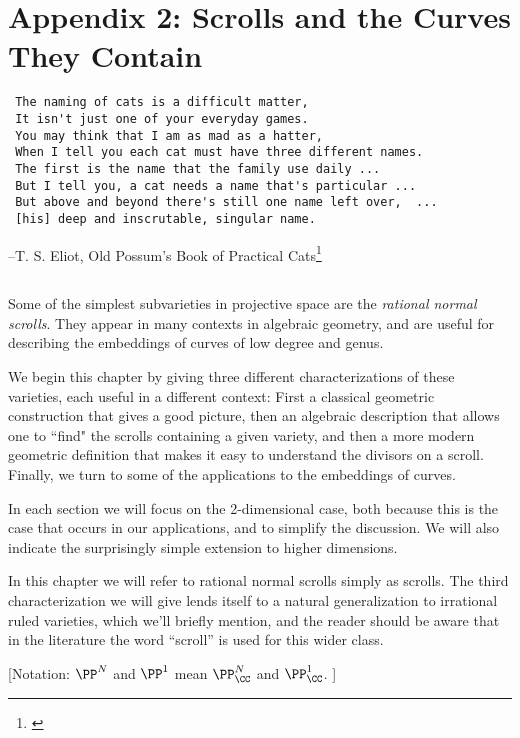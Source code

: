 

\chapter{Appendix 2: Scrolls and the Curves They Contain}
\label{ScrollsChapter}

\begin{verbatim}
 The naming of cats is a difficult matter,
 It isn't just one of your everyday games.
 You may think that I am as mad as a hatter,
 When I tell you each cat must have three different names.
 The first is the name that the family use daily ...
 But I tell you, a cat needs a name that's particular ...
 But above and beyond there's still one name left over,  ...
 [his] deep and inscrutable, singular name.
\end{verbatim}
--T. S. Eliot, Old Possum's Book of Practical Cats\footnote{\cite{PracticalCats}}

\section*{}
Some of the simplest subvarieties in projective space are the \emph{rational normal scrolls}. They appear in many contexts in algebraic geometry, and are useful for describing the embeddings of curves of low degree and genus. 

We begin this chapter by giving three different characterizations of these varieties, each useful in a different context: First a classical geometric construction that gives a good picture, then an algebraic description that allows one to ``find" the scrolls containing a given variety, and then a more modern geometric definition that makes it easy to understand the divisors on a scroll. Finally, we turn to some of the applications to the embeddings of curves.

In each section we will focus on the 2-dimensional case, both because this is the case that occurs in our applications, and to simplify the discussion. We will also indicate the surprisingly simple extension to higher dimensions.

In this chapter we will refer to rational normal scrolls simply as scrolls. The third characterization we will give lends itself to a natural generalization to  irrational ruled varieties, which we'll briefly mention, and the reader should be aware that in the literature the word ``scroll'' is used for this wider class.

[Notation:  $\PP^{N}$ and $\PP^{1}$ mean $\PP_{\CC}^{N}$ and $\PP_{\CC}^{1}$. ]

